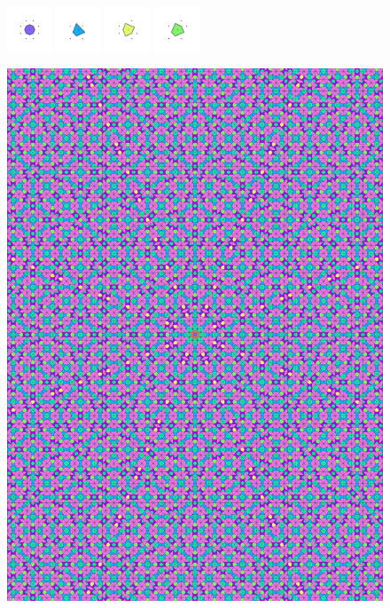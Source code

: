 \documentclass[text.tex]{subfiles}
\begin{document}
\begin{figure}[h!]
\includegraphics[width=0.12\textwidth]{img/results/octagon/octagon_200000_(2_0alpha_1)_005.pdf}
\includegraphics[width=0.12\textwidth]{img/results/octagon/octagon_200000_(2_0alpha_1)_006.pdf}
\includegraphics[width=0.12\textwidth]{img/results/octagon/octagon_200000_(2_0alpha_1)_007.pdf}
\includegraphics[width=0.12\textwidth]{img/results/octagon/octagon_200000_(2_0alpha_1)_008.pdf}
\end{figure}

\begin{figure}[h!]
\centering
\includegraphics[width=1\textwidth]{img/results/octagon/quasi_polygon-octagon_200000_(2_0alpha_1).pdf}
\end{figure}
\end{document}
